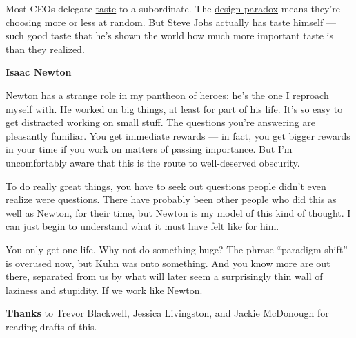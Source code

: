 Most CEOs delegate \href{taste.html}{taste} to a subordinate. The
\href{gh.html}{design paradox} means they're choosing more or less at
random. But Steve Jobs actually has taste himself --- such good taste
that he's shown the world how much more important taste is than they
realized.

\textbf{Isaac Newton}

Newton has a strange role in my pantheon of heroes: he's the one I
reproach myself with. He worked on big things, at least for part of his
life. It's so easy to get distracted working on small stuff. The
questions you're answering are pleasantly familiar. You get immediate
rewards --- in fact, you get bigger rewards in your time if you work on
matters of passing importance. But I'm uncomfortably aware that this is
the route to well-deserved obscurity.

To do really great things, you have to seek out questions people didn't
even realize were questions. There have probably been other people who
did this as well as Newton, for their time, but Newton is my model of
this kind of thought. I can just begin to understand what it must have
felt like for him.

You only get one life. Why not do something huge? The phrase ``paradigm
shift'' is overused now, but Kuhn was onto something. And you know more
are out there, separated from us by what will later seem a surprisingly
thin wall of laziness and stupidity. If we work like Newton.

\textbf{Thanks} to Trevor Blackwell, Jessica Livingston, and Jackie
McDonough for reading drafts of this.
